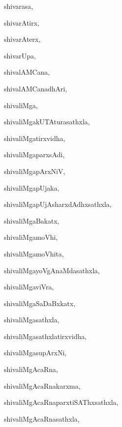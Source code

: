 \begin{multicols}{3}
{\noindent
{shivarasa}, \pageref{shivarasa}

\noindent
{shivarAtirx}, \pageref{shivarAtirx}

\noindent
{shivarAterx}, \pageref{shivarAterx}

\noindent
{shivarUpa}, \pageref{shivarUpa}

\noindent
{shivalAMCana}, \pageref{shivalAMCana}

\noindent
{shivalAMCanadhAri}, \pageref{shivalAMCanadhAri}

\noindent
{shivaliMga}, \pageref{shivaliMga}

\noindent
{shivaliMgakUTAturasathxla}, \pageref{shivaliMgakUTAturasathxla}

\noindent
{shivaliMgatirxvidha}, \pageref{shivaliMgatirxvidha}

\noindent
{shivaliMgaparxsAdi}, \pageref{shivaliMgaparxsAdi}

\noindent
{shivaliMgapArxNiV}, \pageref{shivaliMgapArxNiV}

\noindent
{shivaliMgapUjaka}, \pageref{shivaliMgapUjaka}

\noindent
{shivaliMgapUjAsharxdAdhxsathxla}, \pageref{shivaliMgapUjAsharxdAdhxsathxla}

\noindent
{shivaliMgaBakatx}, \pageref{shivaliMgaBakatx}

\noindent
{shivaliMgamoVhi}, \pageref{shivaliMgamoVhi}

\noindent
{shivaliMgamoVhita}, \pageref{shivaliMgamoVhita}

\noindent
{shivaliMgayoVgAnaMdasathxla}, \pageref{shivaliMgayoVgAnaMdasathxla}

\noindent
{shivaliMgaviVra}, \pageref{shivaliMgaviVra}

\noindent
{shivaliMgaSaDaBxkatx}, \pageref{shivaliMgaSaDaBxkatx}

\noindent
{shivaliMgasathxla}, \pageref{shivaliMgasathxla}

\noindent
{shivaliMgasathxlatirxvidha}, \pageref{shivaliMgasathxlatirxvidha}

\noindent
{shivaliMgasupArxNi}, \pageref{shivaliMgasupArxNi}

\noindent
{shivaliMgAcaRna}, \pageref{shivaliMgAcaRna}

\noindent
{shivaliMgAcaRnakarxma}, \pageref{shivaliMgAcaRnakarxma}

\noindent
{shivaliMgAcaRnaparxtiSAThxsathxla}, \pageref{shivaliMgAcaRnaparxtiSAThxsathxla}

\noindent
{shivaliMgAcaRnasathxla}, \pageref{shivaliMgAcaRnasathxla}

}
\end{multicols}
